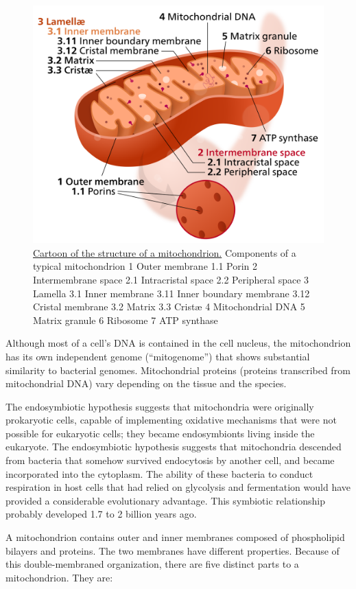 \begin{figure}

{\centering \includegraphics[width=0.7\linewidth]{./figures/cells/Mitochondrion_mini} 

}

\caption{\href{https://commons.wikimedia.org/wiki/File:Mitochondrion_mini.svg}{Cartoon of the structure of a mitochondrion.} Components of a typical mitochondrion 1 Outer membrane 1.1 Porin 2 Intermembrane space 2.1 Intracristal space 2.2 Peripheral space 3 Lamella 3.1 Inner membrane 3.11 Inner boundary membrane 3.12 Cristal membrane 3.2 Matrix 3.3 Cristæ 4 Mitochondrial DNA 5 Matrix granule 6 Ribosome 7 ATP synthase}\label{fig:mitocartoon}
\end{figure}

Although most of a cell's DNA is contained in the cell nucleus, the mitochondrion has its own independent genome (``mitogenome'') that shows substantial similarity to bacterial genomes. Mitochondrial proteins (proteins transcribed from mitochondrial DNA) vary depending on the tissue and the species.

The endosymbiotic hypothesis suggests that mitochondria were originally prokaryotic cells, capable of implementing oxidative mechanisms that were not possible for eukaryotic cells; they became endosymbionts living inside the eukaryote. The endosymbiotic hypothesis suggests that mitochondria descended from bacteria that somehow survived endocytosis by another cell, and became incorporated into the cytoplasm. The ability of these bacteria to conduct respiration in host cells that had relied on glycolysis and fermentation would have provided a considerable evolutionary advantage. This symbiotic relationship probably developed 1.7 to 2 billion years ago.

A mitochondrion contains outer and inner membranes composed of phospholipid bilayers and proteins. The two membranes have different properties. Because of this double-membraned organization, there are five distinct parts to a mitochondrion. They are:

